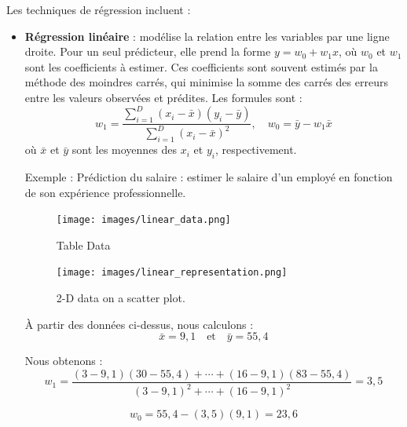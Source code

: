\documentclass[a4paper,12pt]{article}
\begin{document}

Les techniques de régression incluent :

\begin{itemize}
    \item \textbf{Régression linéaire} : modélise la relation entre les variables par une ligne droite. Pour un seul prédicteur, elle prend la forme \( y = w_0 + w_1 x \), où \( w_0 \) et \( w_1 \) sont les coefficients à estimer. Ces coefficients sont souvent estimés par la méthode des moindres carrés, qui minimise la somme des carrés des erreurs entre les valeurs observées et prédites. Les formules sont :
    \[
    w_1 = \frac{\sum_{i=1}^D (x_i - \bar{x})(y_i - \bar{y})}{\sum_{i=1}^D (x_i - \bar{x})^2}, \quad w_0 = \bar{y} - w_1 \bar{x}
    \]
    où \( \bar{x} \) et \( \bar{y} \) sont les moyennes des \( x_i \) et \( y_i \), respectivement.


    Exemple : Prédiction du salaire : estimer le salaire d’un employé en fonction de son expérience professionnelle.

    \begin{figure}[h!]
        \begin{minipage}[b]{0.5\textwidth}
            \centering
            \texttt{[image: images/linear\_data.png]} 
            \caption{Table Data}
        \end{minipage}%
        \begin{minipage}[b]{0.5\textwidth}
            \centering
            \texttt{[image: images/linear\_representation.png]} 
            \caption{2-D data on a scatter plot.}
        \end{minipage}
    \end{figure}

        \begin{minipage}[t]{0.48\textwidth} %
        \vspace{0pt} %
        
        À partir des données ci-dessus, nous calculons :
        \[
        \bar{x} = 9{,}1 \quad \text{et} \quad \bar{y} = 55{,}4
        \]
        
        Nous obtenons :
        \[
        w_1 = \frac{(3 - 9{,}1)(30 - 55{,}4) + \cdots + (16 - 9{,}1)(83 - 55{,}4)}{(3 - 9{,}1)^2 + \cdots + (16 - 9{,}1)^2} = 3{,}5
        \]
        
        \[
        w_0 = 55{,}4 - (3{,}5)(9{,}1) = 23{,}6
        \]
        

\end{minipage}
\end{itemize}
\end{document}
